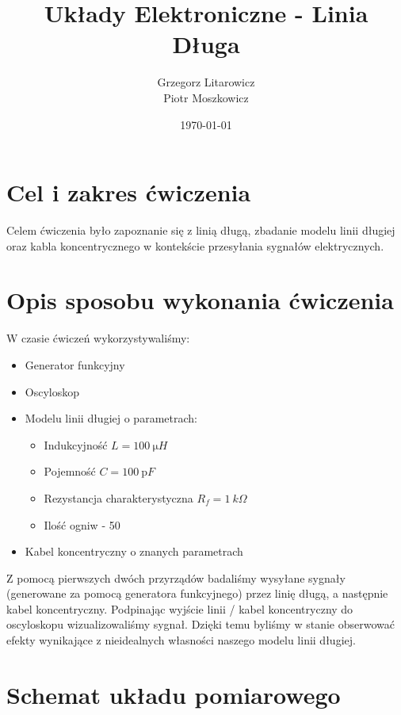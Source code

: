 \documentclass[a4paper,12pt]{article}
\begin{document}
\title{Układy Elektroniczne - Linia Długa}
\author{Grzegorz Litarowicz \\ Piotr Moszkowicz} 
\date{\today}
\maketitle
{}

\newpage
\begin{justify}
\tableofcontents
\newpage
{}

\section{Cel i zakres ćwiczenia}

Celem ćwiczenia było zapoznanie się z linią długą, zbadanie modelu linii długiej oraz kabla koncentrycznego w kontekście przesyłania sygnałów elektrycznych.

\section{Opis sposobu wykonania ćwiczenia}

W czasie ćwiczeń wykorzystywaliśmy:

\begin{itemize}
\item Generator funkcyjny
\item Oscyloskop
\item Modelu linii długiej o parametrach:
\begin{itemize}
\item Indukcyjność $L = \SI{100}{\micro H}$
\item Pojemność $C = \SI{100}{\pico F}$
\item Rezystancja charakterystyczna $R_{f} = \SI{1}{k\Omega}$
\item Ilość ogniw - 50
\end{itemize}
\item Kabel koncentryczny o znanych parametrach
\end{itemize}

Z pomocą pierwszych dwóch przyrządów badaliśmy wysyłane sygnały (generowane za pomocą generatora funkcyjnego) przez linię długą, a następnie kabel koncentryczny. Podpinając wyjście linii / kabel koncentryczny do oscyloskopu wizualizowaliśmy sygnał. Dzięki temu byliśmy w stanie obserwować efekty wynikające z nieidealnych własności naszego modelu linii długiej.

\section{Schemat układu pomiarowego}


\end{justify}
\end{document}
